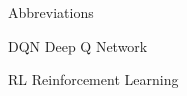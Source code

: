 
\begin{dictionary}{Abbreviations}
\item[DQN]	Deep Q Network
\item[RL]	Reinforcement Learning
\end{dictionary}
